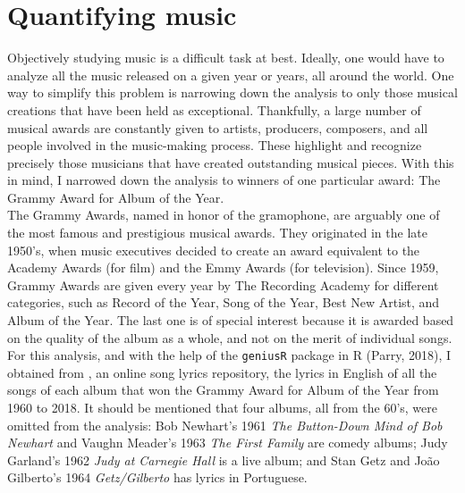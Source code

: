 \documentclass{article}
\begin{document}
\section*{Quantifying music}


Objectively studying music is a difficult task at best. Ideally, one would have to analyze all the music released on a given year or years, all around the world. One way to simplify this problem is narrowing down the analysis to only those musical creations that have been held as exceptional. Thankfully, a large number of musical awards are constantly given to artists, producers, composers, and all people involved in the music-making process. These highlight and recognize precisely those musicians that have created outstanding musical pieces. With this in mind, I narrowed down the analysis to winners of one particular award: The Grammy Award for Album of the Year.  \\


The Grammy Awards, named in honor of the gramophone, are arguably one of the most famous and prestigious musical awards. They originated in the late 1950's, when music executives decided to create an award equivalent to the Academy Awards (for film) and the Emmy Awards (for television). Since 1959, Grammy Awards are given every year by The Recording Academy for different categories, such as Record of the Year, Song of the Year, Best New Artist, and Album of the Year. The last one is of special interest because it is awarded based on the quality of the album as a whole, and not on the merit of individual songs. \\



For this analysis, and with the help of the \texttt{geniusR} package in \textsf{R} (Parry, 2018), I obtained from \href{https://genius.com/}{}, an online song lyrics repository, the lyrics in English of all the songs of each album that won the Grammy Award for Album of the Year from 1960 to 2018. It should be mentioned that four albums, all from the 60's, were omitted from the analysis: Bob Newhart's 1961 \textit{The Button-Down Mind of Bob Newhart} and Vaughn Meader's 1963 \textit{The First Family} are comedy albums; Judy Garland's 1962 \textit{Judy at Carnegie Hall} is a live album; and Stan Getz and Jo\~{a}o Gilberto's 1964 \textit{Getz/Gilberto} has lyrics in Portuguese.  \\
\end{document}
